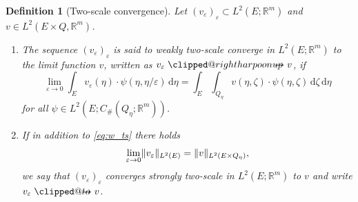 \documentclass[reqno,11pt]{amsart}
\makeatletter
\numberwithin{equation}{section}
\theoremstyle{thmlemcorr}
\numberwithin{theorem}{section}
\theoremstyle{thmlemcorr*}
\theoremstyle{defi}
\newtheorem{definition}[theorem]{Definition}
\theoremstyle{remexample}
\newenvironment{remark}
  {\pushQED{\qed}\renewcommand{\qedsymbol}{$\triangle$}\remarkx}
  {\popQED\endremarkx}
\theoremstyle{ass}
\newcommand{\R}{\mathbb{R}}
\renewcommand{\epsilon}{\varepsilon}
\DeclarePairedDelimiter{\norm}{\lVert}{\rVert}
\newcommand{\1}{\mathds{1}}
\DeclareRobustCommand{\wtwoscale}{%
  \clippedrightharpoonup\mathrel{\mspace{-15mu}}\rightharpoonup
}
\newcommand{\clippedrightharpoonup}{%
  \mathrel{\mathpalette\clipped@rightharpoonup\relax}%
}
\newcommand{\clipped@rightharpoonup}[2]{%
  \sbox\z@{$\m@th#1\mspace{6mu}$}%
  \clipbox{0pt 0pt {\dimexpr\width-.5\wd\z@} 0pt}{$\m@th#1\rightharpoonup$}%
  \smash{\clipbox{{\wd\z@} 0pt 0pt {-\width}}{$\m@th#1\rightharpoonup$}}%
}
\DeclareRobustCommand{\twoscale}{%
  \clippedto\mathrel{\mspace{-15mu}}\to
}
\newcommand{\clippedto}{%
  \mathrel{\mathpalette\clipped@to\relax}%
}
\newcommand{\clipped@to}[2]{%
  \sbox\z@{$\m@th#1\mspace{6mu}$}%
  \clipbox{0pt 0pt {\dimexpr\width-.5\wd\z@} 0pt}{$\m@th#1\to$}%
  \smash{\clipbox{{\wd\z@} 0pt 0pt {-\width}}{$\m@th#1\to$}}%
}
\newcommand{\veps}{\varepsilon}
\newcommand{\dl}{\,\mathrm{d}}
\newcommand{\sequence}[2]{(#1_#2)_{#2}}
\makeatother
\begin{document}
\begin{definition}[Two-scale convergence]\label{def:ts}
     Let \(\sequence{v}{\veps}\subset L^2(E;\R^m)\) and \(v\in L^2(E\times Q,\R^m)\).
    \begin{enumerate}[label = (\roman*)]
        \item 
            The sequence \(\sequence{v}{\veps}\) is said to weakly two-scale converge in $L^2(E; \R^m)$ to the limit function \(v\), written as $v_\epsilon \wtwoscale v$, if
            \begin{equation}\label{eq:w_ts}
                \lim_{\veps\to 0}\int_{E} v_\veps(\eta) \cdot \psi(\eta,\eta/\veps)\dl \eta
                =\int_{E} \int_{ Q_\eta} v(\eta,\zeta)\cdot\psi(\eta,\zeta)\dl \zeta\dl \eta
            \end{equation}
            for all \(\psi\in L^2(E;C_{\#}(Q_\eta;\R^m))\). \smallskip
        \item\label{it:sts}
            If in addition to \eqref{eq:w_ts} there holds
            \begin{equation}\label{eq:s_ts}
                \lim_{\veps\to 0}\norm{v_\veps}_{L^2(E)}
                = \norm{v}_{L^2(E\times Q_\eta)},
            \end{equation}
            we say that \(\sequence{v}{\veps}\) converges strongly two-scale in $L^2(E; \R^m)$ to \(v\) and write $v_\epsilon \twoscale v$.
    \end{enumerate}
\end{definition}
\end{document}

